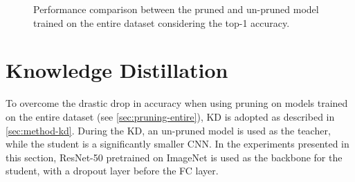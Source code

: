 \begin{figure}[H]
	\centering
    \qquad
	\caption{Performance comparison between the pruned and un-pruned model trained on the entire dataset considering the top-1 accuracy.}%
	\label{fig:exp7}
\end{figure}

\newpage


\section{Knowledge Distillation}
\label{sec:exp-kd}
To overcome the drastic drop in accuracy when using pruning on models trained on the entire dataset (see \autoref{sec:pruning-entire}), KD is adopted as described in \autoref{sec:method-kd}. During the KD, an un-pruned model is used as the teacher, while the student is a significantly smaller CNN. In the experiments presented in this section, ResNet-50 pretrained on ImageNet is used as the backbone for the student, with a dropout layer before the FC layer.

